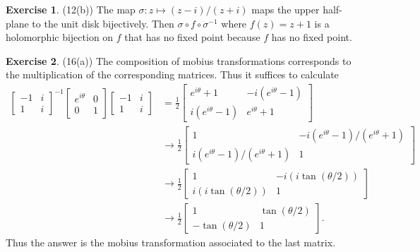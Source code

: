 \documentclass[12pt, psamsfonts]{amsart}
\theoremstyle{definition}
\newtheorem*{exer}{Exercise}
\theoremstyle{remark}
\numberwithin{equation}{section}
\begin{document}
\begin{exer}{(12(b))}
  The map $\sigma: z \mapsto (z - i) / (z + i)$ maps the upper half-plane to the unit disk bijectively.
  Then $\sigma \circ f \circ \sigma^{-1}$ where $f(z) = z + 1$ is a holomorphic bijection on $f$ that has no fixed point because $f$ has no fixed point.
\end{exer}

\begin{exer}{(16(a))}
  The composition of mobius transformations corresponds to the multiplication of the corresponding matrices.
  Thus it suffices to calculate
  \begin{align*}
    \begin{bmatrix}
      -1 & i \\
      1 & i
    \end{bmatrix}^{-1}
    \begin{bmatrix}
      e^{i\theta} & 0 \\
      0 & 1
    \end{bmatrix}
    \begin{bmatrix}
      -1 & i \\
      1 & i
    \end{bmatrix}
    &= \frac{1}{2} \begin{bmatrix} e^{i\theta} + 1 & -i(e^{i\theta} - 1) \\ i(e^{i\theta} - 1) & e^{i\theta} + 1 \end{bmatrix} \\
    &\rightarrow \frac{1}{2} \begin{bmatrix} 1 & -i(e^{i\theta} - 1) / (e^{i\theta} + 1) \\ i(e^{i\theta} - 1) / (e^{i\theta} + 1)  & 1 \end{bmatrix} \\
    &\rightarrow \frac{1}{2} \begin{bmatrix} 1 & -i(i\tan(\theta / 2))  \\ i(i\tan(\theta / 2))  & 1 \end{bmatrix} \\
    &\rightarrow \frac{1}{2} \begin{bmatrix} 1 & \tan(\theta / 2)  \\ -\tan(\theta / 2)  & 1 \end{bmatrix}.
  \end{align*}
  Thus the answer is the mobius transformation associated to the last matrix.
\end{exer}
\end{document}
